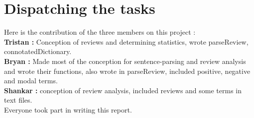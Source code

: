 \documentclass[paper=a4,fontsize=12pt]{report}
\begin{document}
\section{Dispatching the tasks}
	Here is the contribution of the three members on this project :
\\ \linebreak
\textbf{Tristan : } Conception of reviews and determining statistics, wrote parseReview, connotatedDictionary.
\\
\textbf{Bryan : } Made most of the conception for sentence-parsing and review analysis and wrote their functions, also wrote in parseReview, included positive, negative and modal terms.\\
\textbf{Shankar : } conception of review analysis, included reviews and some terms in text files.
\\
Everyone took part in writing this report.
\\ \linebreak
\end{document}
